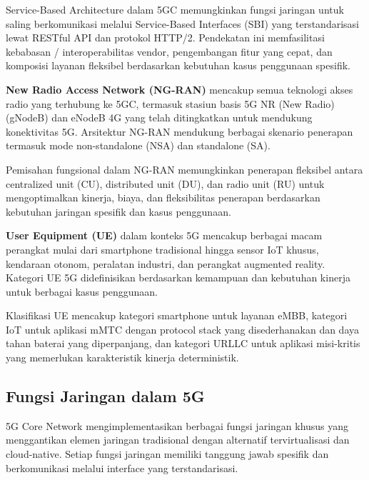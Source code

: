 Service-Based Architecture dalam 5GC memungkinkan fungsi jaringan untuk saling berkomunikasi melalui Service-Based Interfaces (SBI) yang terstandarisasi lewat RESTful API dan protokol HTTP/2. Pendekatan ini memfasilitasi kebabasan / interoperabilitas vendor, pengembangan fitur yang cepat, dan komposisi layanan fleksibel berdasarkan kebutuhan kasus penggunaan spesifik.

\textbf{New Radio Access Network (NG-RAN)} mencakup semua teknologi akses radio yang terhubung ke 5GC, termasuk stasiun basis 5G NR (New Radio) (gNodeB) dan eNodeB 4G yang telah ditingkatkan untuk mendukung konektivitas 5G. Arsitektur NG-RAN mendukung berbagai skenario penerapan termasuk mode non-standalone (NSA) dan standalone (SA).

Pemisahan fungsional dalam NG-RAN memungkinkan penerapan fleksibel antara centralized unit (CU), distributed unit (DU), dan radio unit (RU) untuk mengoptimalkan kinerja, biaya, dan fleksibilitas penerapan berdasarkan kebutuhan jaringan spesifik dan kasus penggunaan.

\textbf{User Equipment (UE)} dalam konteks 5G mencakup berbagai macam perangkat mulai dari smartphone tradisional hingga sensor IoT khusus, kendaraan otonom, peralatan industri, dan perangkat augmented reality. Kategori UE 5G didefinisikan berdasarkan kemampuan dan kebutuhan kinerja untuk berbagai kasus penggunaan.

Klasifikasi UE mencakup kategori smartphone untuk layanan eMBB, kategori IoT untuk aplikasi mMTC dengan protocol stack yang disederhanakan dan daya tahan baterai yang diperpanjang, dan kategori URLLC untuk aplikasi misi-kritis yang memerlukan karakteristik kinerja deterministik.

\subsection{Fungsi Jaringan dalam 5G}

5G Core Network mengimplementasikan berbagai fungsi jaringan khusus yang menggantikan elemen jaringan tradisional dengan alternatif tervirtualisasi dan cloud-native. Setiap fungsi jaringan memiliki tanggung jawab spesifik dan berkomunikasi melalui interface yang terstandarisasi.


